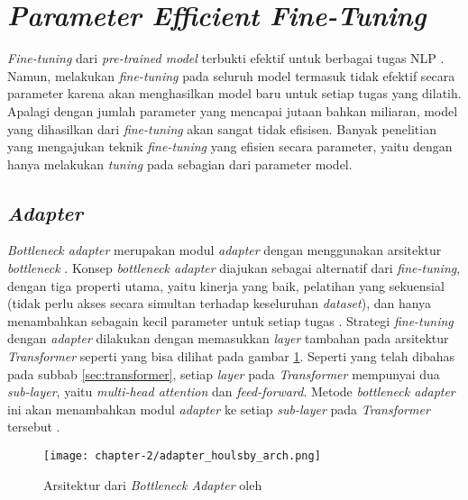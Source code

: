 \section{\textit{Parameter Efficient Fine-Tuning}}
\label{sec:peft}

\textit{Fine-tuning} dari \textit{pre-trained model} terbukti efektif untuk berbagai tugas NLP \parencite{fine_tuning}. Namun, melakukan \textit{fine-tuning} pada seluruh model termasuk tidak efektif secara parameter karena akan menghasilkan model baru untuk setiap tugas yang dilatih. Apalagi dengan jumlah parameter yang mencapai jutaan bahkan miliaran, model yang dihasilkan dari \textit{fine-tuning} akan sangat tidak efisisen. Banyak penelitian yang mengajukan teknik \textit{fine-tuning} yang efisien secara parameter, yaitu \PEFT dengan hanya melakukan \textit{tuning} pada sebagian dari parameter model.

\subsection{\textit{Adapter}}

\textit{Bottleneck adapter} merupakan modul \textit{adapter} dengan menggunakan arsitektur \textit{bottleneck} \parencite{adapter_houlsby}. Konsep \textit{bottleneck adapter} diajukan sebagai alternatif dari \textit{fine-tuning}, dengan tiga properti utama, yaitu kinerja yang baik, pelatihan yang sekuensial (tidak perlu akses secara simultan terhadap keseluruhan \textit{dataset}), dan hanya menambahkan sebagain kecil parameter untuk setiap tugas \parencite{adapter_houlsby}. Strategi \textit{fine-tuning} dengan \textit{adapter} dilakukan dengan memasukkan \textit{layer} tambahan pada arsitektur \textit{Transformer} seperti yang bisa dilihat pada gambar \ref{fig:adapters_houlsby_arch}. Seperti yang telah dibahas pada subbab \ref{sec:transformer}, setiap \textit{layer} pada \textit{Transformer} mempunyai dua \textit{sub-layer}, yaitu \textit{multi-head attention} dan \textit{feed-forward}. Metode \textit{bottleneck adapter} ini akan menambahkan modul \textit{adapter} ke setiap \textit{sub-layer} pada \textit{Transformer} tersebut \parencite{adapter_houlsby}.

\begin{figure}[h]
    \vspace{0.25cm}
    \centering
    \texttt{[image: chapter-2/adapter\_houlsby\_arch.png]}
    \caption{Arsitektur dari \textit{Bottleneck Adapter} oleh \citeauthor{adapter_houlsby} \parencite{adapter_houlsby}}
    \label{fig:adapters_houlsby_arch}
\end{figure}

